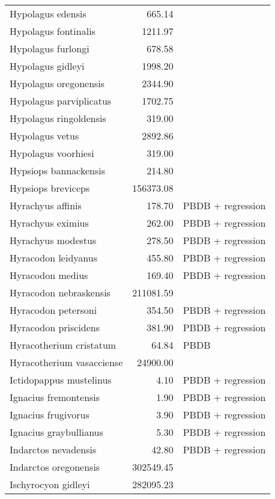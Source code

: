 \begin{table}[ht]
\begin{tabular}{lrl}
  Hypolagus edensis & 665.14 & \cite{Tomiya2013} \\ 
  Hypolagus fontinalis & 1211.97 & \cite{Tomiya2013} \\ 
  Hypolagus furlongi & 678.58 & \cite{Tomiya2013} \\ 
  Hypolagus gidleyi & 1998.20 & \cite{Tomiya2013} \\ 
  Hypolagus oregonensis & 2344.90 & \cite{Tomiya2013} \\ 
  Hypolagus parviplicatus & 1702.75 & \cite{Tomiya2013} \\ 
  Hypolagus ringoldensis & 319.00 & \cite{McKenna2011} \\ 
  Hypolagus vetus & 2892.86 & \cite{Tomiya2013} \\ 
  Hypolagus voorhiesi & 319.00 & \cite{McKenna2011} \\ 
  Hypsiops bannackensis & 214.80 & \cite{Wang1999} \\ 
  Hypsiops breviceps & 156373.08 & \cite{Tomiya2013} \\ 
  Hyrachyus affinis & 178.70 & PBDB + regression \\ 
  Hyrachyus eximius & 262.00 & PBDB + regression \\ 
  Hyrachyus modestus & 278.50 & PBDB + regression \\ 
  Hyracodon leidyanus & 455.80 & PBDB + regression \\ 
  Hyracodon medius & 169.40 & PBDB + regression \\ 
  Hyracodon nebraskensis & 211081.59 & \cite{Tomiya2013} \\ 
  Hyracodon petersoni & 354.50 & PBDB + regression \\ 
  Hyracodon priscidens & 381.90 & PBDB + regression \\ 
  Hyracotherium cristatum & 64.84 & PBDB \\ 
  Hyracotherium vasacciense & 24900.00 & \cite{MacFadden1986} \\ 
  Ictidopappus mustelinus & 4.10 & PBDB + regression \\ 
  Ignacius fremontensis & 1.90 & PBDB + regression \\ 
  Ignacius frugivorus & 3.90 & PBDB + regression \\ 
  Ignacius graybullianus & 5.30 & PBDB + regression \\ 
  Indarctos nevadensis & 42.80 & PBDB + regression \\ 
  Indarctos oregonensis & 302549.45 & \cite{Tomiya2013} \\ 
  Ischyrocyon gidleyi & 282095.23 & \cite{Tomiya2013} \\ 

\end{tabular}
\end{table}

